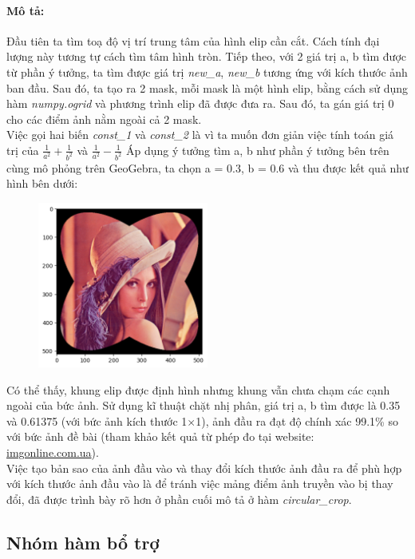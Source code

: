 \documentclass[]{article}
\begin{document}
\paragraph{Mô tả:} Đầu tiên ta tìm toạ độ vị trí trung tâm của hình elip cần cắt. Cách tính đại lượng này tương tự cách tìm tâm hình tròn. Tiếp theo, với 2 giá trị a, b tìm được từ phần ý tưởng, ta tìm được giá trị \textit{new\_a}, \textit{new\_b} tương ứng với kích thước ảnh ban đầu. Sau đó, ta tạo ra 2 mask, mỗi mask là một hình elip, bằng cách sử dụng hàm \textit{numpy.ogrid} và phương trình elip đã được đưa ra. Sau đó, ta gán giá trị 0 cho các điểm ảnh nằm ngoài cả 2 mask.\\
Việc gọi hai biến \textit{const\_1} và \textit{const\_2} là vì ta muốn đơn giản việc tính toán giá trị của $\frac{1}{a^2} + \frac{1}{b^2}$ và $\frac{1}{a^2} - \frac{1}{b^2}$
Áp dụng ý tưởng tìm a, b như phần ý tưởng bên trên cùng mô phỏng trên GeoGebra, ta chọn a = 0.3, b = 0.6 và thu được kết quả như hình bên dưới:
\begin{figure}[!ht]
  \centering
  \includegraphics[width=0.5\textwidth]{image/lenna_03_06.png}
\end{figure} \par
Có thể thấy, khung elip được định hình nhưng khung vẫn chưa chạm các cạnh ngoài của bức ảnh. Sử dụng kĩ thuật chặt nhị phân, giá trị a, b tìm được là 0.35 và 0.61375 (với bức ảnh kích thước 1$\times$1), ảnh đầu ra đạt độ chính xác 99.1\% so với bức ảnh đề bài (tham khảo kết quả từ phép đo tại website: \href{https://www.imgonline.com.ua/eng/similarity-percent.php}{imgonline.com.ua}).\\
Việc tạo bản sao của ảnh đầu vào và thay đổi kích thước ảnh đầu ra để phù hợp với kích thước ảnh đầu vào là để tránh việc mảng điểm ảnh truyền vào bị thay đổi, đã được trình bày rõ hơn ở phần cuối mô tả ở hàm \textit{circular\_crop}.
\subsection{Nhóm hàm bổ trợ}
\end{document}
